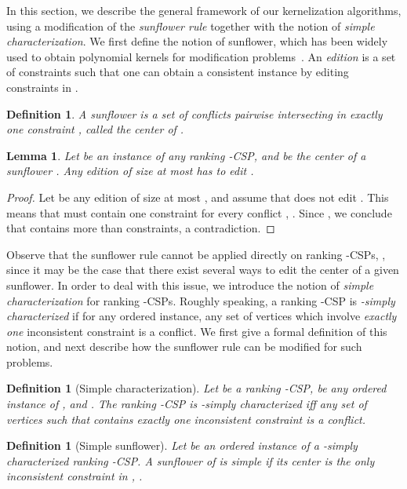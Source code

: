 \documentclass[11pt]{article}
\newtheorem{definition}[theorem]{Definition}
\newtheorem{lemma}[theorem]{Lemma}
\begin{document}
In this section, we describe the general framework of our kernelization algorithms, using a modification of the \emph{sunflower rule} together with the notion of \emph{simple characterization}. We first define the notion of sunflower, which has been widely used to obtain polynomial kernels for modification problems~\cite{Abu10,ALS09,BP11,GHPP12}.
An \emph{edition} is a set of constraints  such that one can obtain a consistent instance by editing constraints in .  

\begin{definition}
	A \emph{sunflower}  is a set of conflicts  pairwise intersecting in \emph{exactly one} constraint , called the \emph{center} of .
\end{definition} 

\begin{lemma}
\label{lem:flower}
	Let  be an instance of any ranking -CSP, and  be the center of a sunflower  . Any edition of size at most  has to edit .
\end{lemma}

\begin{proof}
	Let  be any edition of size at most , and assume that  does not edit . This means that  must contain one constraint for every conflict , . Since , we conclude that  contains more than  constraints, a contradiction.
 \end{proof}

Observe that the sunflower rule cannot be applied directly on ranking -CSPs, , since it may be the case that there exist several ways to edit the center of a given sunflower. In order to deal with this issue, we introduce the notion of \emph{simple characterization} for ranking -CSPs. 
Roughly speaking, a ranking -CSP is \emph{-simply characterized} if for any ordered instance, any set of  vertices which involve \emph{exactly one} inconsistent constraint is a conflict. We first give a formal definition of this notion, and next describe how the sunflower rule can be modified for such problems. 

\begin{definition}[Simple characterization]
\label{def:simplecharac}
	Let  be a ranking -CSP,  be any ordered instance of , and . The ranking -CSP  is \emph{-simply characterized} iff any set  of  vertices such that  contains exactly one inconsistent constraint is a conflict. 
	
\end{definition}



\begin{definition}[Simple sunflower]
\label{def:simplesunflower}
	 Let  be an ordered instance of a -simply 
	 characterized ranking -CSP. A sunflower  of 
	  is \emph{simple} if its center is the only inconsistent constraint in , .
	 
\end{definition}
\end{document}
